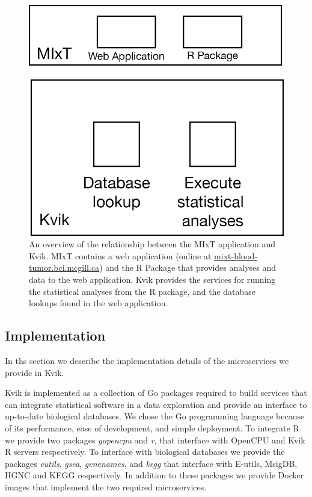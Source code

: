 \begin{figure}[h!]
\centering
\includegraphics{figures/kvik-mixt.png}
\caption{An overview of the relationship between the MIxT application and Kvik.
MIxT contains a web application (online at \url{mixt-blood-tumor.bci.mcgill.ca})
and the R Package that provides analyses and data to the web application. Kvik
provides the services for running the statistical analyses from the R package,
and the database lookups found in the web application.} \label{kvik-mixt}
\end{figure} 

\subsection*{Implementation} 
In ths section we describe the implementation details of the microservices we
provide in Kvik.

Kvik is implemented as a collection of Go packages required to build services
that can integrate statistical software in a data exploration and provide an
interface to up-to-date biological databases. We chose the Go programming
language because of its performance, ease of development, and simple deployment.
To integrate R we provide two packages \emph{gopencpu} and \emph{r}, that
interface with OpenCPU and Kvik R servers respectively. To interface with
biological databases we provide the packages \emph{eutils}, \emph{gsea},
\emph{genenames}, and \emph{kegg} that interface with E-utils, MsigDB, HGNC and
KEGG respectively.  In addition to these packages we provide Docker images that
implement the two required microservices. 

